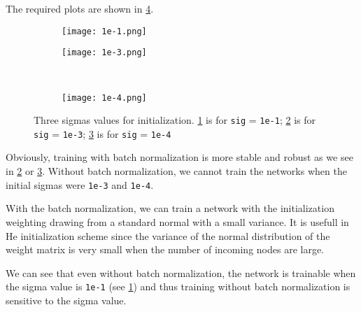 \documentclass[12pt]{article}
\newenvironment{question}[2][Question]{\begin{trivlist}
\kern10pt
\item[\hskip \labelsep {\bfseries #1}\hskip \labelsep {\bfseries #2.}]}{\end{trivlist}}
\begin{document}
\begin{question}{v}

    The required plots are shown in \cref{fig:all_sig}.

    \begin{figure}
        \begin{subfigure}{.5\linewidth}
        \centering
        \texttt{[image: 1e-1.png]}
        \caption{}
        \label{fig:sig_1e-1}
    \end{subfigure}%
    \begin{subfigure}{.5\linewidth}
        \centering
        \texttt{[image: 1e-3.png]}
        \caption{}
        \label{fig:sig_1e-3}
    \end{subfigure}\\[1ex]
    \begin{subfigure}{\linewidth}
        \centering
        \texttt{[image: 1e-4.png]}
        \caption{}
        \label{fig:sig_1e-4}
        \end{subfigure}
        \caption{
            Three sigmas values for initialization.
            \cref{fig:sig_1e-1} is for \texttt{sig} = \texttt{1e-1};
            \cref{fig:sig_1e-3} is for \texttt{sig} = \texttt{1e-3};
            \cref{fig:sig_1e-4} is for \texttt{sig} = \texttt{1e-4}
        }
        \label{fig:all_sig}
    \end{figure}

    Obviously, training with batch normalization is more stable and robust as
    we see in \cref{fig:sig_1e-3} or \cref{fig:sig_1e-4}. Without batch normalization,
    we cannot train the networks when the initial sigmas were \texttt{1e-3} and \texttt{1e-4}.

    With the batch normalization, we can train a network with the initialization weighting
    drawing from a standard normal with a small variance.
    It is usefull in He initialization scheme since the variance of the normal distribution
    of the weight matrix is very small when the number of incoming nodes are large.

    We can see that even without batch normalization, the network is trainable when the sigma value is
    \texttt{1e-1} (see \cref{fig:sig_1e-1})
    and thus training without batch normalization is sensitive to the sigma value.
\end{question}
\end{document}

